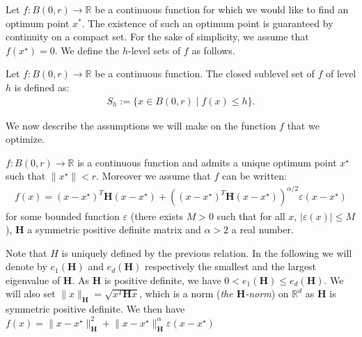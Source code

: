 Let $f:B(0,r)\to \mathbb{R}$ be a continuous function for which we would like to find an optimum point $x^*$. The existence of such an optimum point is guaranteed by continuity on a compact set.
For the sake of simplicity, we assume that $f(x^{\star}) = 0$. We define the $h$-level sets of $f$ as follows.
\begin{definition}
Let $f:B(0,r)\to \mathbb{R}$ be a continuous function. The closed sublevel set of $f$ of level $h$ is defined as:
\begin{align*}
    S_{h}:=\{x\in B(0,r)\mid f(x)\leq h\}.
\end{align*}
\end{definition}
We now describe the assumptions we will make on the function $f$ that we optimize. 
\begin{assump}
\label{ass:principal}
$f:B(0,r)\to \mathbb{R}$ is a continuous function and admits a unique optimum point $x^\star$ such that $\lVert x^{\star}\rVert<r$. Moreover we assume that $f$ can be written:
\begin{align*}
f(x)=\left(x-x^\star\right)^T\mathbf{H}\left(x-x^\star\right)+ \left(\left(x-x^\star\right)^T\mathbf{H}\left(x-x^\star\right)\right)^{\alpha/2} \varepsilon(x-x^\star)
\end{align*}
for some bounded function $\varepsilon$ (there exists $M>0$ such that for all $x$, $\lvert \varepsilon(x)\rvert \leq M$), $\mathbf{H}$ a symmetric positive definite matrix and $\alpha>2$ a real number. 

\end{assump}
Note that $H$ is uniquely defined by the previous relation.
In the following we will denote by $e_1(\mathbf{H})$ and $e_d(\mathbf{H})$ respectively the smallest and the largest eigenvalue of $\mathbf{H}$. As $\mathbf{H}$ is positive definite, we have $0<e_1(\mathbf{H})\leq e_d(\mathbf{H})$. We will also set $\lVert x\rVert_{\mathbf{H}}=\sqrt{x^T\mathbf{H}x}$, which is a norm (\emph{the $\mathbf{H}$-norm}) on $\mathbb{R}^{d}$ as $\mathbf{H}$ is symmetric positive definite. We then have $f(x)=\lVert x-x^{\star}\rVert_{\mathbf{H}}^2+ \lVert x-x^{\star}\rVert_{\mathbf{H}}^{\alpha} \varepsilon(x-x^\star)$ 
